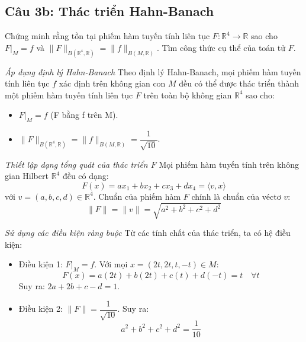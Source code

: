 \subsection*{Câu 3b: Thác triển Hahn-Banach}

\begin{questionbox}
Chứng minh rằng tồn tại phiếm hàm tuyến tính liên tục $F : \mathbb{R}^4 \to \mathbb{R}$ sao cho $F|_M = f$ và $\|F\|_{B(\mathbb{R}^4, \mathbb{R})} = \|f\|_{B(M, \mathbb{R})}$. Tìm công thức cụ thể của toán tử $F$.
\end{questionbox}

\begin{solution}
\textit{Áp dụng định lý Hahn-Banach}
Theo định lý Hahn-Banach, mọi phiếm hàm tuyến tính liên tục $f$ xác định trên không gian con $M$ đều có thể được thác triển thành một phiếm hàm tuyến tính liên tục $F$ trên toàn bộ không gian $\mathbb{R}^4$ sao cho:
\begin{itemize}
    \item $F|_M = f$ (F bằng f trên M).
    \item $\|F\|_{B(\mathbb{R}^4, \mathbb{R})} = \|f\|_{B(M, \mathbb{R})} = \dfrac{1}{\sqrt{10}}$.
\end{itemize}

\textit{Thiết lập dạng tổng quát của thác triển $F$}
Mọi phiếm hàm tuyến tính trên không gian Hilbert $\mathbb{R}^4$ đều có dạng:
\[
    F(x) = ax_1 + bx_2 + cx_3 + dx_4 = \langle v, x \rangle
\]
với $v = (a, b, c, d) \in \mathbb{R}^4$.
Chuẩn của phiếm hàm $F$ chính là chuẩn của véctơ $v$:
\[
    \|F\| = \|v\| = \sqrt{a^2 + b^2 + c^2 + d^2}
\]

\textit{Sử dụng các điều kiện ràng buộc}
Từ các tính chất của thác triển, ta có hệ điều kiện:
\begin{itemize}
    \item Điều kiện 1: $F|_M = f$. Với mọi $x = (2t, 2t, t, -t) \in M$:
    \[
        F(x) = a(2t) + b(2t) + c(t) + d(-t) = t \quad \forall t
    \]
    Suy ra: $2a + 2b + c - d = 1$.
    
    \item Điều kiện 2: $\|F\| = \dfrac{1}{\sqrt{10}}$. Suy ra:
    \[
        a^2 + b^2 + c^2 + d^2 = \dfrac{1}{10}
    \]
\end{itemize}


\end{solution}
